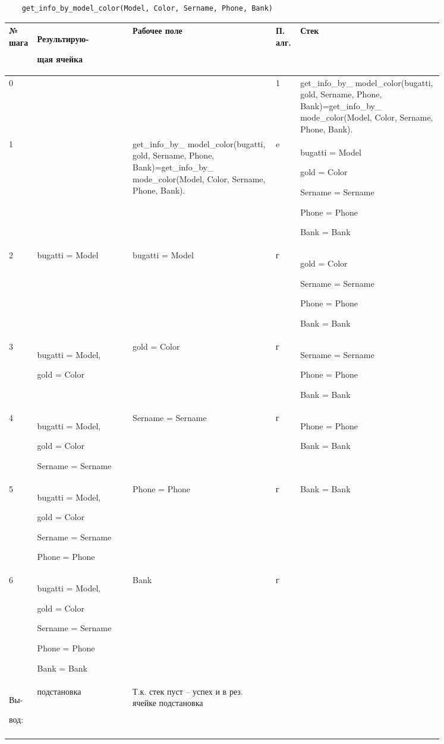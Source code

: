\documentclass[a4paper,12pt]{article}
\begin{document}
	\begin{verbatim}
	get_info_by_model_color(Model, Color, Sername, Phone, Bank)
	\end{verbatim}
	
	\begin{center}
		\begin{longtable}[h!]{|p{0.025\linewidth}|p{0.2\linewidth}|p{ 0.3\linewidth}|p{ 0.025\linewidth}|p{ 0.3\linewidth}|}
			\hline
			{\bf  № шага} & {\bf Результирую-
				
				щая ячейка} & {\bf Рабочее поле} & {\bf П. алг.} & {\bf Стек}\\
			\hline
			{0} & {} & {} & {1} & {get\_info\_by\_
				model\_color(bugatti, gold, Sername, Phone, Bank)=get\_info\_by\_
				mode\_color(Model, Color, Sername, Phone, Bank).}\\
			\hline
			{1} & {} & {get\_info\_by\_
				model\_color(bugatti, gold, Sername, Phone, Bank)=get\_info\_by\_
				mode\_color(Model, Color, Sername, Phone, Bank).} & {e} & {bugatti = Model
			
		gold = Color
	
Sername = Sername

Phone = Phone

Bank = Bank}\\
			\hline
			{2} & {bugatti = Model} & {bugatti = Model} & {г} & {gold = Color
				
				Sername = Sername
				
				Phone = Phone
				
				Bank = Bank}\\
			\hline
			{3} & {bugatti = Model,
			
		gold = Color} & {gold = Color} & {г} & {Sername = Sername
		
		Phone = Phone
		
		Bank = Bank}\\
			\hline
			{4} & {bugatti = Model,
				
			gold = Color
		
	Sername = Sername} & {Sername = Sername} & {г} & {Phone = Phone
			
			Bank = Bank}\\
			\hline
			{5} & {bugatti = Model,
				
				gold = Color
				
				Sername = Sername
			
		Phone = Phone} & {Phone = Phone} & {г} & {Bank = Bank}\\
			\hline
			{6} & {bugatti = Model,
				
				gold = Color
				
				Sername = Sername
				
				Phone = Phone
			
		Bank = Bank} & {Bank} & {г} & {}\\
			\hline
			{Вы-
				
				вод:} & {подстановка} & {Т.к. стек пуст – успех и 
				в рез. ячейке подстановка} & {}\\
			\hline
			\label{m3}
		\end{longtable}
	\end{center}
	
	
\end{document}
